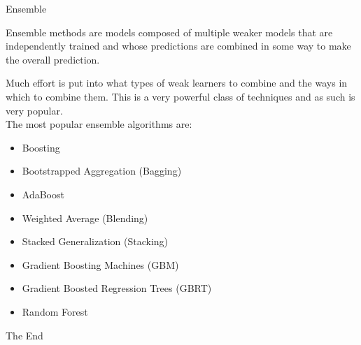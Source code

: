 \documentclass{beamer}
\begin{document}
\begin{frame}{Ensemble}
	\begin{flushleft}
	Ensemble methods are models composed of multiple weaker models that are independently trained and whose predictions are combined in some way to make the overall prediction.

Much effort is put into what types of weak learners to combine and the ways in which to combine them. This is a very powerful class of techniques and as such is very popular.
\\
\vspace{10pt}
The most popular ensemble algorithms are:

\begin{itemize}
	\item Boosting
\item Bootstrapped Aggregation (Bagging)
\item AdaBoost
\item Weighted Average (Blending)
\item Stacked Generalization (Stacking)
\item Gradient Boosting Machines (GBM)
\item Gradient Boosted Regression Trees (GBRT)
\item Random Forest
\end{itemize}

	\end{flushleft}
\end{frame}
\begin{frame}
\huge{\centerline{The End}}
\end{frame}
\end{document}
